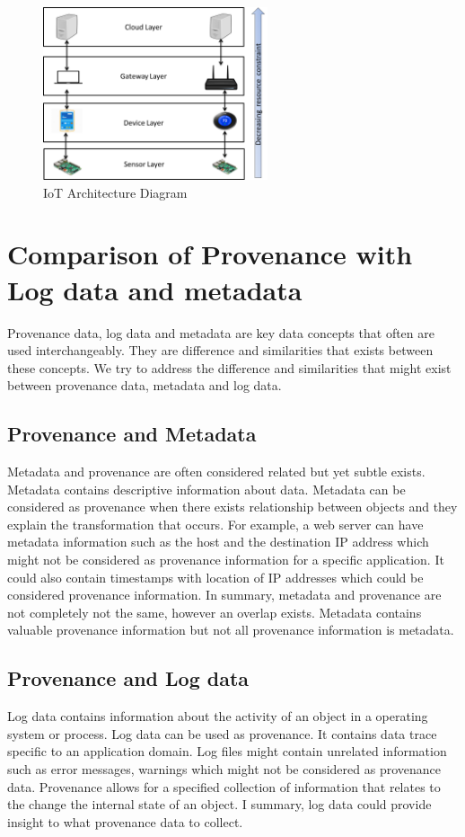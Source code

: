 \begin{figure}[h]
\begin{center}

\includegraphics[height=2.0in]{iot_architecture.png}
\end{center}
\caption{IoT Architecture Diagram}

\end{figure}



\section{Comparison of Provenance with Log data and metadata}

Provenance data, log data and metadata are key data concepts that often are used interchangeably. They are difference and similarities that exists between these concepts. We try to address the difference and similarities that might exist between provenance data, metadata and log data.

\subsection{Provenance and Metadata}
Metadata and provenance are often considered related but yet subtle exists. Metadata contains descriptive information about data. Metadata can be considered as provenance when there exists relationship between objects and they explain the transformation that occurs. For example, a web server can have metadata information such as the host and the destination IP address which might not be considered as provenance information for a specific application. It could also contain timestamps with location of IP addresses which could be considered provenance information. In summary,  metadata and provenance are not completely not the same, however an overlap exists. Metadata contains valuable  provenance information but not all provenance information is metadata. 


\subsection{Provenance and Log data}
Log data contains information about the activity of an object in a operating system or process. Log data can be used as provenance. It contains data trace specific to an application domain. Log files might contain unrelated information such as error messages, warnings which might not be considered as provenance data. Provenance allows for a specified collection of information that relates to the change the internal state of an object. I summary, log data could provide insight to what provenance data to collect. 

